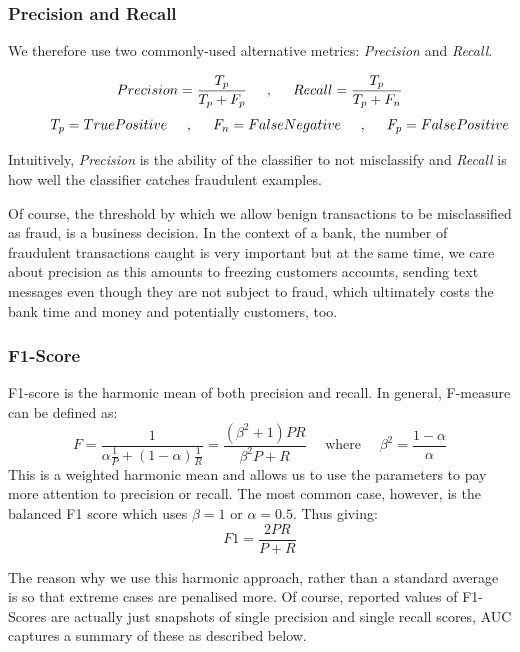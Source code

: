 \documentclass[12pt,a4paper,twoside]{report}
\begin{document}
\subsubsection{Precision and Recall}

We therefore use two commonly-used alternative metrics: {\em Precision} and {\em Recall}.

\[
    {Precision} = \frac{T_p}{T_p+F_p} \hspace{5mm} , \hspace{5mm} {Recall} = \frac{T_p}{T_p+F_n} 
\]
\[
	\hspace{1cm}  {T_p} = {True Positive} \hspace{5mm},\hspace{5mm} {F_n} = {False Negative}\hspace{5mm},\hspace{5mm} {F_p} = {False Positive}
\]

Intuitively, {\em Precision} is the ability of the classifier to not misclassify and {\em Recall} is how well the classifier catches fraudulent examples. 

Of course, the threshold by which we allow benign transactions to be misclassified as fraud, is a business decision. In the context of a bank, the number of fraudulent transactions caught is very important but at the same time, we care about precision as this amounts to freezing customers accounts, sending text messages even though they are not subject to fraud, which ultimately costs the bank time and money and potentially customers, too.

\subsubsection{F1-Score}

F1-score is the harmonic mean of both precision and recall. In general, F-measure can be defined as:
$$F = \frac { 1} { \alpha \frac { 1} { P } + ( 1- \alpha ) \frac { 1} { R } } = \frac { \left( \beta ^ { 2} + 1\right) P R } { \beta ^ { 2} P + R } \quad \text{ where } \quad \beta ^ { 2} = \frac { 1- \alpha } { \alpha }$$
This is a weighted harmonic mean and allows us to use the parameters to pay more attention to precision or recall. The most common case, however, is the balanced F1 score which uses $\beta = 1$ or $\alpha=0.5.$
Thus giving:
$$F1 = \frac { 2P R } { P + R }$$

The reason why we use this harmonic approach, rather than a standard average is so that extreme cases are penalised more. Of course, reported values of F1-Scores are actually just snapshots of single precision and single recall scores, AUC captures a summary of these as described below. 
\end{document}
